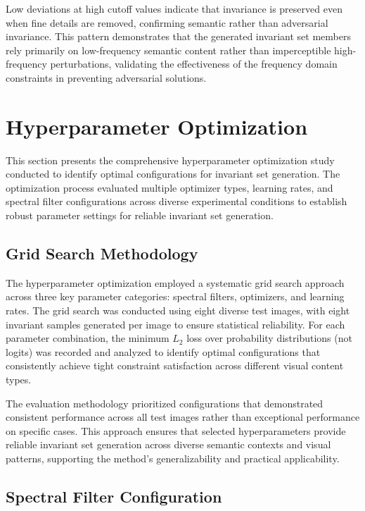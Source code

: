 Low deviations at high cutoff values indicate that invariance is preserved even when fine details are removed, confirming semantic rather than adversarial invariance. This pattern demonstrates that the generated invariant set members rely primarily on low-frequency semantic content rather than imperceptible high-frequency perturbations, validating the effectiveness of the frequency domain constraints in preventing adversarial solutions.

\section{Hyperparameter Optimization}\label{appendix:hyperparameters}

This section presents the comprehensive hyperparameter optimization study conducted to identify optimal configurations for invariant set generation. The optimization process evaluated multiple optimizer types, learning rates, and spectral filter configurations across diverse experimental conditions to establish robust parameter settings for reliable invariant set generation.

\subsection{Grid Search Methodology}

The hyperparameter optimization employed a systematic grid search approach across three key parameter categories: spectral filters, optimizers, and learning rates. The grid search was conducted using eight diverse test images, with eight invariant samples generated per image to ensure statistical reliability. For each parameter combination, the minimum $L_2$ loss over probability distributions (not logits) was recorded and analyzed to identify optimal configurations that consistently achieve tight constraint satisfaction across different visual content types.

The evaluation methodology prioritized configurations that demonstrated consistent performance across all test images rather than exceptional performance on specific cases. This approach ensures that selected hyperparameters provide reliable invariant set generation across diverse semantic contexts and visual patterns, supporting the method's generalizability and practical applicability.

\subsection{Spectral Filter Configuration}

